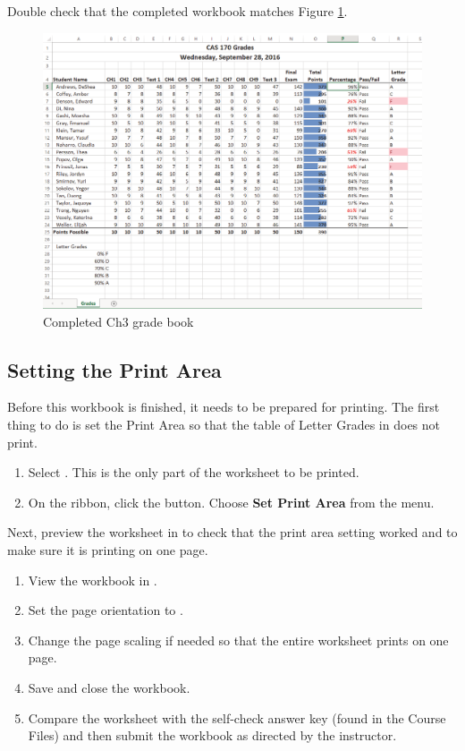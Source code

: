 Double check that the completed workbook matches Figure \ref{03:fig25}.

\begin{figure}[H]
	\centering
	\includegraphics[width=\maxwidth{.95\linewidth}]{gfx/ch03_fig25}
	\caption{Completed Ch3 grade book}
	\label{03:fig25}
\end{figure}

\subsection{Setting the Print Area}

Before this workbook is finished, it needs to be prepared for printing. The first thing to do is set the Print Area so that the table of Letter Grades in  does not print.

\begin{enumerate}
	\item Select . This is the only part of the worksheet to be printed.
	\item On the  ribbon, click the  button. Choose \textbf{Set Print Area} from the menu.
\end{enumerate}

Next, preview the worksheet in  to check that the print area setting worked and to make sure it is printing on one page.

\begin{enumerate}
	\item View the workbook in .
	\item Set the page orientation to .
	\item Change the page scaling if needed so that the entire worksheet prints on one page.
	\item Save and close the  workbook.
	\item Compare the worksheet with the self-check answer key (found in the Course Files) and then submit the  workbook as directed by the instructor.
\end{enumerate}

